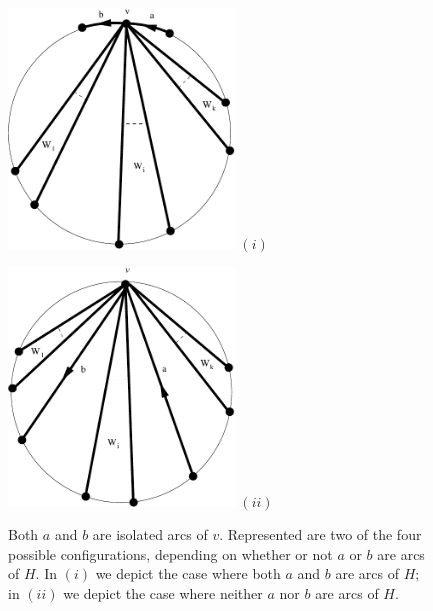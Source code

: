 \documentclass[12pt,letterpaper,oneside]{book}
\begin{document}
\begin{figure}[htp] 
\begin{minipage}[b]{0.5\linewidth}
\centering 
\includegraphics[width=6cm]{bothisoh.pdf}
\newline
$(i)$
\end{minipage}
\hspace{0.5cm}
\begin{minipage}[b]{0.5\linewidth}
\centering
\includegraphics[width=6cm]{bothiso.pdf}
\newline
$(ii)$
\end{minipage}
\caption[The incoming and outgoing arcs of a vertex are both isolated]{Both $a$ and $b$ are isolated arcs of $v$.  Represented are two 
of the four possible configurations, depending on whether or not $a$ or $b$ are arcs of $H$.
In $(i)$ we depict the case where both $a$ and $b$ are arcs of $H$; in $(ii)$ we depict the case 
where neither $a$ nor $b$ are arcs of $H$. \label{fig:bothiso}}
\end{figure}
\end{document}
